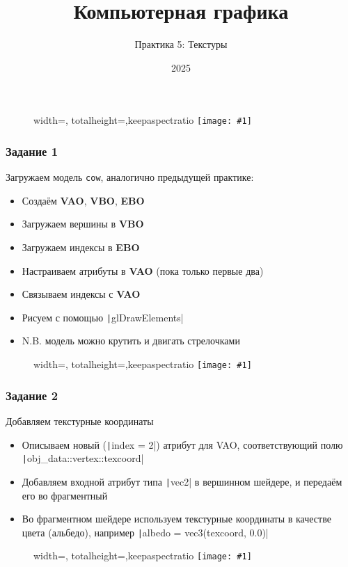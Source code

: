 \documentclass[10pt]{beamer}
\title{Компьютерная графика}
\subtitle{Практика 5: Текстуры}
\date{2025}
\newcommand{\slideimage}[1]{
  \begin{figure}
    \begin{adjustbox}{width=\textwidth, totalheight=\textheight-2\baselineskip-2\baselineskip,keepaspectratio}
      \texttt{[image: \#1]}
    \end{adjustbox}
  \end{figure}
}
\begin{document}
\frame{\titlepage}

\begin{frame}[fragile]
\slideimage{0.png}
\end{frame}


\begin{frame}[fragile]
\frametitle{Задание 1}
Загружаем модель \verb|cow|, аналогично предыдущей практике:
\begin{itemize}
\item Создаём \textbf{VAO}, \textbf{VBO}, \textbf{EBO}
\item Загружаем вершины в \textbf{VBO}
\item Загружаем индексы в \textbf{EBO}
\item Настраиваем атрибуты в \textbf{VAO} (пока только первые два)
\item Связываем индексы с \textbf{VAO}
\item Рисуем с помощью \texttt|glDrawElements|
\item N.B. модель можно крутить и двигать стрелочками
\end{itemize}
\end{frame}

\begin{frame}[fragile]
\slideimage{1.png}
\end{frame}

\begin{frame}[fragile]
\frametitle{Задание 2}
Добавляем текстурные координаты
\begin{itemize}
\item Описываем новый (\texttt|index = 2|) атрибут для VAO, соответствующий полю \texttt|obj_data::vertex::texcoord|
\item Добавляем входной атрибут типа \texttt|vec2| в вершинном шейдере, и передаём его во фрагментный
\item Во фрагментном шейдере используем текстурные координаты в качестве цвета (альбедо), например \texttt|albedo = vec3(texcoord, 0.0)|
\end{itemize}
\end{frame}

\begin{frame}[fragile]
\slideimage{2.png}
\end{frame}
\end{document}
